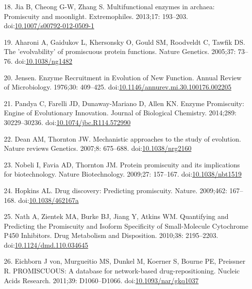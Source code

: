 \documentclass[12pt,twoside]{reedthesis}
\begin{document}
  \hypertarget{ref-jiaux5fmultifunctionalux5f2013}{}
  18. Jia B, Cheong G-W, Zhang S. Multifunctional enzymes in archaea:
  Promiscuity and moonlight. Extremophiles. 2013;17: 193--203.
  doi:\href{https://doi.org/10.1007/s00792-012-0509-1}{10.1007/s00792-012-0509-1}
  
  \hypertarget{ref-aharoniux5fevolvabilityux5f2005}{}
  19. Aharoni A, Gaidukov L, Khersonsky O, Gould SM, Roodveldt C, Tawfik
  DS. The 'evolvability' of promiscuous protein functions. Nature
  Genetics. 2005;37: 73--76.
  doi:\href{https://doi.org/10.1038/ng1482}{10.1038/ng1482}
  
  \hypertarget{ref-jensenux5fenzymeux5f1976}{}
  20. Jensen. Enzyme Recruitment in Evolution of New Function. Annual
  Review of Microbiology. 1976;30: 409--425.
  doi:\href{https://doi.org/10.1146/annurev.mi.30.100176.002205}{10.1146/annurev.mi.30.100176.002205}
  
  \hypertarget{ref-pandyaux5fenzymeux5f2014}{}
  21. Pandya C, Farelli JD, Dunaway-Mariano D, Allen KN. Enzyme
  Promiscuity: Engine of Evolutionary Innovation. Journal of Biological
  Chemistry. 2014;289: 30229--30236.
  doi:\href{https://doi.org/10.1074/jbc.R114.572990}{10.1074/jbc.R114.572990}
  
  \hypertarget{ref-deanux5fmechanisticux5f2007}{}
  22. Dean AM, Thornton JW. Mechanistic approaches to the study of
  evolution. Nature reviews Genetics. 2007;8: 675--688.
  doi:\href{https://doi.org/10.1038/nrg2160}{10.1038/nrg2160}
  
  \hypertarget{ref-nobeliux5fproteinux5f2009}{}
  23. Nobeli I, Favia AD, Thornton JM. Protein promiscuity and its
  implications for biotechnology. Nature Biotechnology. 2009;27: 157--167.
  doi:\href{https://doi.org/10.1038/nbt1519}{10.1038/nbt1519}
  
  \hypertarget{ref-hopkinsux5fdrugux5f2009}{}
  24. Hopkins AL. Drug discovery: Predicting promiscuity. Nature.
  2009;462: 167--168.
  doi:\href{https://doi.org/10.1038/462167a}{10.1038/462167a}
  
  \hypertarget{ref-nathux5fquantifyingux5f2010}{}
  25. Nath A, Zientek MA, Burke BJ, Jiang Y, Atkins WM. Quantifying and
  Predicting the Promiscuity and Isoform Specificity of Small-Molecule
  Cytochrome P450 Inhibitors. Drug Metabolism and Disposition. 2010;38:
  2195--2203.
  doi:\href{https://doi.org/10.1124/dmd.110.034645}{10.1124/dmd.110.034645}
  
  \hypertarget{ref-vonux5feichbornux5fpromiscuous:ux5f2011}{}
  26. Eichborn J von, Murgueitio MS, Dunkel M, Koerner S, Bourne PE,
  Preissner R. PROMISCUOUS: A database for network-based
  drug-repositioning. Nucleic Acids Research. 2011;39: D1060--D1066.
  doi:\href{https://doi.org/10.1093/nar/gkq1037}{10.1093/nar/gkq1037}
  
\end{document}
